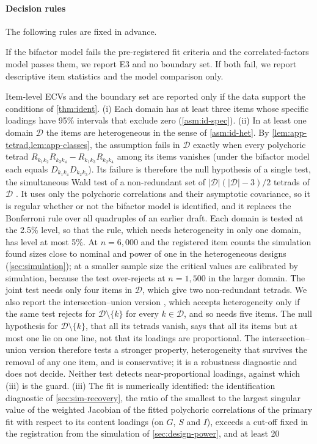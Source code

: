 \paragraph{Decision rules}
The following rules are fixed in advance.
\begin{description}[style=unboxed,leftmargin=0pt]
  \item[D1, structure.] If the bifactor model fails the pre-registered fit criteria and the correlated-factors model passes them, we report E3 and no boundary set. If both fail, we report descriptive item statistics and the model comparison only.
  \item[D2, identification.] Item-level ECVs and the boundary set are reported only if the data support the conditions of \cref{thm:ident}. (i) Each domain has at least three items whose specific loadings have 95\% intervals that exclude zero (\cref{asm:id-spec}). (ii) In at least one domain $\mathcal D$ the items are heterogeneous in the sense of \cref{asm:id-het}. By \cref{lem:app-tetrad,lem:app-classes}, the assumption fails in $\mathcal D$ exactly when every polychoric tetrad $R_{k_1k_2}R_{k_3k_4}-R_{k_1k_3}R_{k_2k_4}$ among its items vanishes (under the bifactor model each equals $D_{k_1k_4}D_{k_2k_3}$). Its failure is therefore the null hypothesis of a single test, the simultaneous Wald test of a non-redundant set of $|\mathcal D|(|\mathcal D|-3)/2$ tetrads of $\mathcal D$ \citep{bollen1993tetrad}. It uses only the polychoric correlations and their asymptotic covariance, so it is regular whether or not the bifactor model is identified, and it replaces the Bonferroni rule over all quadruples of an earlier draft. Each domain is tested at the 2.5\% level, so that the rule, which needs heterogeneity in only one domain, has level at most 5\%. At $n=6{,}000$ and the registered item counts the simulation found sizes close to nominal and power of one in the heterogeneous designs (\cref{sec:simulation}); at a smaller sample size the critical values are calibrated by simulation, because the test over-rejects at $n=1{,}500$ in the larger domain. The joint test needs only four items in $\mathcal D$, which give two non-redundant tetrads. We also report the intersection--union version \citep{berger1982}, which accepts heterogeneity only if the same test rejects for $\mathcal D\setminus\{k\}$ for every $k\in\mathcal D$, and so needs five items. The null hypothesis for $\mathcal D\setminus\{k\}$, that all its tetrads vanish, says that all its items but at most one lie on one line, not that its loadings are proportional. The intersection--union version therefore tests a stronger property, heterogeneity that survives the removal of any one item, and is conservative; it is a robustness diagnostic and does not decide. Neither test detects near-proportional loadings, against which (iii) is the guard. (iii) The fit is numerically identified: the identification diagnostic of \cref{sec:sim-recovery}, the ratio of the smallest to the largest singular value of the weighted Jacobian of the fitted polychoric correlations of the primary fit with respect to its content loadings (on $G$, $S$ and $I$), exceeds a cut-off fixed in the registration from the simulation of \cref{sec:design-power}, and at least 20 
\end{description}
